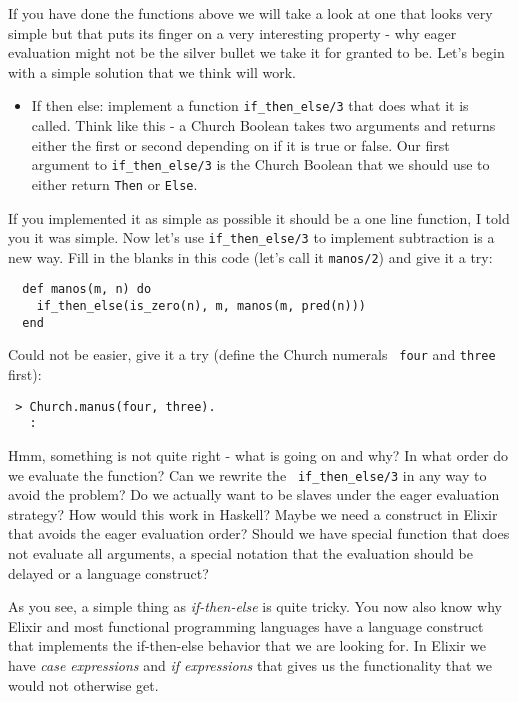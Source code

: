 \documentclass[a4paper,11pt]{article}
\begin{document}
If you have done the functions above we will take a look at one that
looks very simple but that puts its finger on a very interesting
property - why eager evaluation might not be the silver bullet we take
it for granted to be. Let's begin with a simple solution that we think
will work.


\begin{itemize}
\item If then else: implement a function {\tt if_then_else/3} that
  does what it is called. Think like this - a Church Boolean takes two
  arguments and returns either the first or second depending on if it
  is true or false. Our first argument to {\tt if_then_else/3} is the
  Church Boolean that we should use to either return {\tt Then} or {\tt Else}. 
\end{itemize}

If you implemented it as simple as possible it should be a one line
function, I told you it was simple. Now let's use {\tt if_then_else/3}
to implement subtraction is a new way. Fill in the blanks in this code
(let's call it {\tt manos/2}) and give it a try:

\begin{verbatim}
  def manos(m, n) do
    if_then_else(is_zero(n), m, manos(m, pred(n)))
  end
\end{verbatim}

Could not be easier, give it a try (define the Church numerals {\tt
  four} and {\tt three} first):

\begin{verbatim}
 > Church.manus(four, three).
   :
\end{verbatim}

Hmm, something is not quite right - what is going on and why? In what
order do we evaluate the function?  Can we rewrite the {\tt
  if_then_else/3} in any way to avoid the problem? Do we actually want
to be slaves under the eager evaluation strategy? How would this work
in Haskell?  Maybe we need a construct in Elixir that avoids the eager
evaluation order? Should we have special function that does not
evaluate all arguments, a special notation that the evaluation should
be delayed or a language construct?

As you see, a simple thing as {\em if-then-else} is quite tricky. You
now also know why Elixir and most functional programming languages have
a language construct that implements the if-then-else behavior that we
are looking for. In Elixir we have {\em case expressions} and {\em if
  expressions} that gives us the functionality that we would not
otherwise get.
\end{document}
